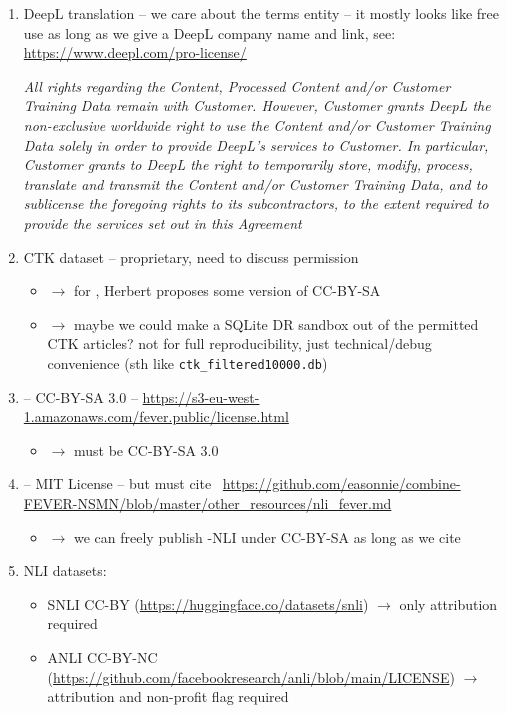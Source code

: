 \begin{enumerate}
    \item DeepL translation -- we care about the  terms entity -- it mostly looks like free use as long as we give a DeepL company name and link, see: \url{https://www.deepl.com/pro-license/}

    \textit{All rights regarding the Content, Processed Content and/or Customer Training Data remain with Customer. However, Customer grants DeepL the non-exclusive worldwide right to use the Content and/or Customer Training Data solely in order to provide DeepL’s services to Customer. In particular, Customer grants to DeepL the right to temporarily store, modify, process, translate and transmit the Content and/or Customer Training Data, and to sublicense the foregoing rights to its subcontractors, to the extent required to provide the services set out in this Agreement}
    \item CTK dataset -- proprietary, need to discuss permission
    \begin{itemize}
        \item $\rightarrow$ for \CTKNLI, Herbert proposes some version of CC-BY-SA
        \item $\rightarrow$ maybe we could make a SQLite DR sandbox out of the permitted CTK articles? not for full reproducibility, just technical/debug convenience (sth like \texttt{ctk\_filtered10000.db}) 
    \end{itemize}
    \item \FEN{} -- CC-BY-SA 3.0 -- \url{https://s3-eu-west-1.amazonaws.com/fever.public/license.html}
    \begin{itemize}
        \item $\rightarrow$ \FCZ must be CC-BY-SA 3.0 
    \end{itemize}
    \item \FEVERNLI{} -- MIT License -- but must cite~\cite{nie2019combining} \url{https://github.com/easonnie/combine-FEVER-NSMN/blob/master/other_resources/nli_fever.md}
    \begin{itemize}
        \item $\rightarrow$ we can freely publish \FCZ-NLI under CC-BY-SA as long as we cite
    \end{itemize}
    \item NLI datasets: 
    \begin{itemize}
        \item SNLI CC-BY (\url{https://huggingface.co/datasets/snli}) $\rightarrow$ only attribution required
        \item ANLI CC-BY-NC (\url{https://github.com/facebookresearch/anli/blob/main/LICENSE}) $\rightarrow$ attribution and non-profit flag required
    \end{itemize}
\end{enumerate}